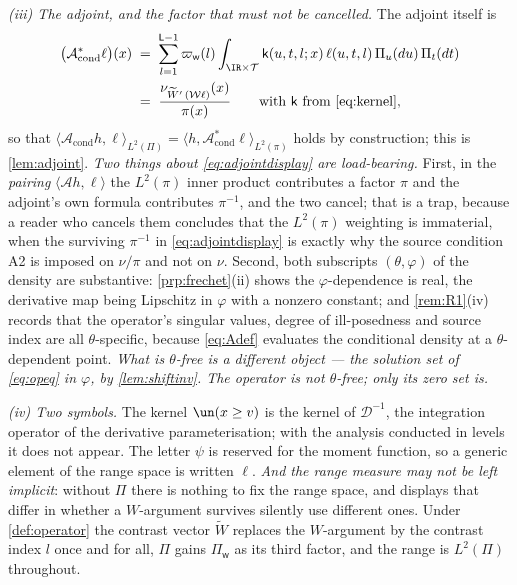 \begin{remark}
\emph{(iii) The adjoint, and the factor that must not be cancelled.} The adjoint itself is
\begin{equation}\label{eq:adjointdisplay}
\begin{split}
\big(\mathcal A^\ast_{\mathrm{cond}}\ell\big)(x)\;&=\;\sum_{l=1}^{\mathsf L-1}\varpi_{\mathsf w}(l)
\int_{\IR\times\mathcal T}\mathsf k(u,t,l;x)\,\ell(u,t,l)\,\Pi_u(du)\,\Pi_t(dt)\\
&=\;\frac{\nu_{\widetilde W'\,(\mathcal W\ell)}(x)}{\pi(x)}
\qquad\text{with }\mathsf k\text{ from \eqref{eq:kernel}},
\end{split}
\end{equation}
so that $\langle\mathcal A_{\mathrm{cond}}h,\ell\rangle_{L^2(\Pi)}=\langle h,\mathcal A^\ast_{\mathrm{cond}}\ell\rangle_{L^2(\pi)}$
holds by construction; this is \cref{lem:adjoint}. \emph{Two things about
\eqref{eq:adjointdisplay} are load-bearing.} First, in the \emph{pairing}
$\langle\mathcal A h,\ell\rangle$ the $L^2(\pi)$ inner product contributes a factor $\pi$ and the
adjoint's own formula contributes $\pi^{-1}$, and the two cancel; that is a trap, because a reader who
cancels them concludes that the $L^2(\pi)$ weighting is immaterial, when the surviving $\pi^{-1}$ in
\eqref{eq:adjointdisplay} is exactly why the source condition A2 is imposed on $\nu/\pi$ and not on
$\nu$. Second, both subscripts $(\theta,\varphi)$ of the density are substantive:
\cref{prp:frechet}(ii) shows the $\varphi$-dependence is real, the derivative map being Lipschitz in
$\varphi$ with a nonzero constant; and \cref{rem:R1}(iv) records that the operator's singular values,
degree of ill-posedness and source index are all $\theta$-specific, because \eqref{eq:Adef} evaluates
the conditional density at a $\theta$-dependent point. \emph{What is $\theta$-free is a different object
--- the solution set of \eqref{eq:opeq} in $\varphi$, by \cref{lem:shiftinv}. The operator is not
$\theta$-free; only its zero set is.}

\emph{(iv) Two symbols.} The kernel $\un(x\ge v)$ is the kernel of
$\mathcal D^{-1}$, the integration operator of the derivative parameterisation; with the analysis
conducted in levels it does not appear. The letter $\psi$ is reserved for the moment function, so a
generic element of the range space is written $\ell$. \emph{And the range measure may not be left
implicit}: without $\Pi$ there is nothing to fix the range space, and displays that differ in whether a
$W$-argument survives silently use different ones. Under \cref{def:operator} the contrast vector
$\widetilde W$ replaces the $W$-argument by the contrast index $l$ once and for all, $\Pi$ gains
$\Pi_{\mathsf w}$ as its third factor, and the range is $L^{2}(\Pi)$ throughout.
\end{remark}


